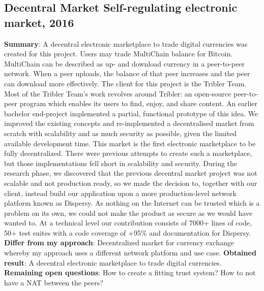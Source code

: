 \documentclass[11pt]{article}
\begin{document}
\subsection{Decentral Market Self-regulating electronic market, 2016 \cite{decentralMarket}}
\textbf{Summary}: A decentral electronic marketplace to trade digital currencies was created for this project. Users may trade MultiChain balance for Bitcoin. MultiChain can be described as up- and download currency in a peer-to-peer network. When a peer uploads, the balance of that peer increases and the peer can download more effectively. The client for this project is the Tribler Team. Most of the Tribler Team’s work revolves around Tribler: an open-source peer-to-peer program which enables its users to find, enjoy, and share content. An earlier bachelor end-project implemented a partial, functional prototype of this idea. We improved the existing concepts and re-implemented a decentralised market from scratch with scalability and as much security as possible, given the limited available development time. This market is the first electronic marketplace to be fully decentralized. There were previous attempts to create such a marketplace, but those implementations fell short in scalability and security. During the research phase, we discovered that the previous decentral market project was not scalable and not production ready, so we made the decision to, together with our client, instead build our application upon a more production-level network platform known as Dispersy. As nothing on the Internet can be trusted which is a problem on its own, we could not make the product as secure as we would have wanted to. At a technical level our contribution consists of 7000+ lines of code, 50+ test suites with a code coverage of +95\% and documentation for Dispersy.\newline
\textbf{Differ from my approach}: Decentralized market for currency exchange whereby my approach uses a different network platform and use case.\newline
\textbf{Obtained result}: A decentral electronic marketplace to trade digital currencies.\newline
\textbf{Remaining open questions}: How to create a fitting trust system? How to not have a NAT between the peers? \newline
\end{document}
